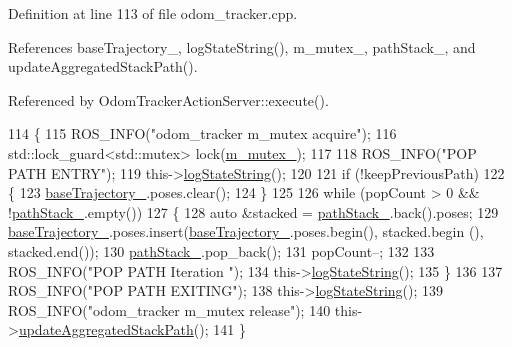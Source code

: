 Definition at line 113 of file odom\+\_\+tracker.\+cpp.



References base\+Trajectory\+\_\+, log\+State\+String(), m\+\_\+mutex\+\_\+, path\+Stack\+\_\+, and update\+Aggregated\+Stack\+Path().



Referenced by Odom\+Tracker\+Action\+Server\+::execute().


\begin{DoxyCode}
114 \{
115   ROS\_INFO(\textcolor{stringliteral}{"odom\_tracker m\_mutex acquire"});
116   std::lock\_guard<std::mutex> lock(\hyperlink{classcl__move__base__z_1_1odom__tracker_1_1OdomTracker_aa371639e1eee269273dec8d3ab9dba0f}{m\_mutex\_});
117 
118   ROS\_INFO(\textcolor{stringliteral}{"POP PATH ENTRY"});
119   this->\hyperlink{classcl__move__base__z_1_1odom__tracker_1_1OdomTracker_a6d0b450474d9d555205ff4281965164e}{logStateString}();
120 
121   \textcolor{keywordflow}{if} (!keepPreviousPath)
122   \{
123     \hyperlink{classcl__move__base__z_1_1odom__tracker_1_1OdomTracker_a466d18a86df049f0f680e043bb5ea91f}{baseTrajectory\_}.poses.clear();
124   \}
125 
126   \textcolor{keywordflow}{while} (popCount > 0 && !\hyperlink{classcl__move__base__z_1_1odom__tracker_1_1OdomTracker_a1ccad1b568b6c65da43ba6639b6bd1ef}{pathStack\_}.empty())
127   \{
128     \textcolor{keyword}{auto} &stacked = \hyperlink{classcl__move__base__z_1_1odom__tracker_1_1OdomTracker_a1ccad1b568b6c65da43ba6639b6bd1ef}{pathStack\_}.back().poses;
129     \hyperlink{classcl__move__base__z_1_1odom__tracker_1_1OdomTracker_a466d18a86df049f0f680e043bb5ea91f}{baseTrajectory\_}.poses.insert(\hyperlink{classcl__move__base__z_1_1odom__tracker_1_1OdomTracker_a466d18a86df049f0f680e043bb5ea91f}{baseTrajectory\_}.poses.begin(), stacked.begin
      (), stacked.end());
130     \hyperlink{classcl__move__base__z_1_1odom__tracker_1_1OdomTracker_a1ccad1b568b6c65da43ba6639b6bd1ef}{pathStack\_}.pop\_back();
131     popCount--;
132 
133     ROS\_INFO(\textcolor{stringliteral}{"POP PATH Iteration "});
134     this->\hyperlink{classcl__move__base__z_1_1odom__tracker_1_1OdomTracker_a6d0b450474d9d555205ff4281965164e}{logStateString}();
135   \}
136 
137   ROS\_INFO(\textcolor{stringliteral}{"POP PATH EXITING"});
138   this->\hyperlink{classcl__move__base__z_1_1odom__tracker_1_1OdomTracker_a6d0b450474d9d555205ff4281965164e}{logStateString}();
139   ROS\_INFO(\textcolor{stringliteral}{"odom\_tracker m\_mutex release"});
140   this->\hyperlink{classcl__move__base__z_1_1odom__tracker_1_1OdomTracker_a7922f1e1e688a2ed62d32d9914985a9f}{updateAggregatedStackPath}();
141 \}
\end{DoxyCode}
